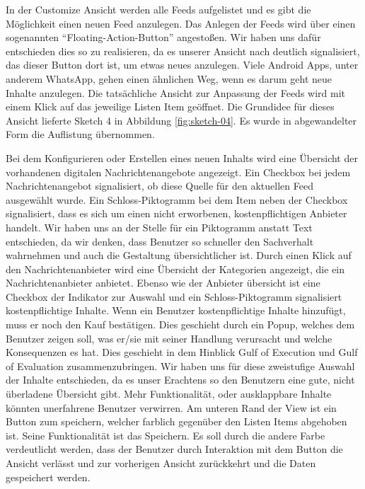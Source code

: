 In der Customize Ansicht werden alle Feeds aufgelistet und es gibt die Möglichkeit einen neuen Feed anzulegen. Das Anlegen der Feeds wird über einen sogenannten \enquote{Floating-Action-Button} angestoßen. Wir haben uns dafür entschieden dies so zu realisieren, da es unserer Ansicht nach deutlich signalisiert, das dieser Button dort ist, um etwas neues anzulegen. Viele Android Apps, unter anderem WhatsApp, gehen einen ähnlichen Weg, wenn es darum geht neue Inhalte anzulegen. Die tatsächliche Ansicht zur Anpassung der Feeds wird mit einem Klick auf das jeweilige Listen Item geöffnet. Die Grundidee für dieses Ansicht lieferte Sketch 4 in Abbildung \ref{fig:sketch-04}. Es wurde in abgewandelter Form die Auflistung übernommen.

Bei dem Konfigurieren oder Erstellen eines neuen Inhalts wird eine Übersicht der vorhandenen digitalen Nachrichtenangebote angezeigt. Ein Checkbox bei jedem Nachrichtenangebot signalisiert, ob diese Quelle für den aktuellen Feed ausgewählt wurde. Ein Schloss-Piktogramm bei dem Item neben der Checkbox signalisiert, dass es sich um einen nicht erworbenen, kostenpflichtigen Anbieter handelt. Wir haben uns an der Stelle für ein Piktogramm anstatt Text entschieden, da wir denken, dass Benutzer so schneller den Sachverhalt wahrnehmen und auch die Gestaltung übersichtlicher ist. Durch einen Klick auf den Nachrichtenanbieter wird eine Übersicht der Kategorien angezeigt, die ein Nachrichtenanbieter anbietet. Ebenso wie der Anbieter übersicht ist eine Checkbox der Indikator zur Auswahl und ein Schloss-Piktogramm signalisiert kostenpflichtige Inhalte. Wenn ein Benutzer kostenpflichtige Inhalte hinzufügt, muss er noch den Kauf bestätigen. Dies geschieht durch ein Popup, welches dem Benutzer zeigen soll, was er/sie mit seiner Handlung verursacht und welche Konsequenzen es hat. Dies geschieht in dem Hinblick Gulf of Execution und Gulf of Evaluation zusammenzubringen. Wir haben uns für diese zweistufige Auswahl der Inhalte entschieden, da es unser Erachtens so den Benutzern eine gute, nicht überladene Übersicht gibt. Mehr Funktionalität, oder ausklappbare Inhalte könnten unerfahrene Benutzer verwirren. Am unteren Rand der View ist ein Button zum speichern, welcher farblich gegenüber den Listen Items abgehoben ist. Seine Funktionalität ist das Speichern. Es soll durch die andere Farbe verdeutlicht werden, dass der Benutzer durch Interaktion mit dem Button die Ansicht verlässt und zur vorherigen Ansicht zurückkehrt und die Daten gespeichert werden.


